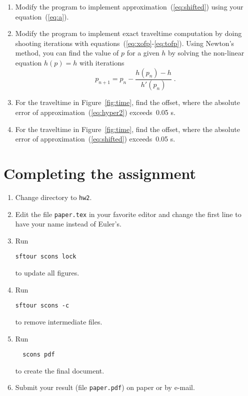 \begin{enumerate}
\item Modify the program to implement approximation~(\ref{eq:shifted}) using your equation~(\ref{eq:a}).
\item Modify the program to implement exact traveltime computation by doing shooting iterations with equations~(\ref{eq:xofp}-\ref{eq:tofp}). 
Using Newton's method, you can find the value of $p$ for a given $h$ by solving the non-linear equation $h(p)=h$ with iterations
\begin{equation}
\label{eq:newton2}
p_{n+1} = p_n - \frac{h(p_n)-h}{h'(p_n)}\;.
\end{equation}
\item For the traveltime in Figure~\ref{fig:time}, find the offset, where the absolute error of approximation~(\ref{eq:hyper2}) exceeds~0.05 s. 
\item For the traveltime in Figure~\ref{fig:time}, find the offset, where the absolute error of approximation~(\ref{eq:shifted}) exceeds~0.05 s. 
\end{enumerate}

\lstset{language=c,numbers=left,numberstyle=\tiny,showstringspaces=false}


\lstset{language=fortran,numbers=left,numberstyle=\tiny,showstringspaces=false}


\lstset{language=python,numbers=left,numberstyle=\tiny,showstringspaces=false}



\section{Completing the assignment}

\begin{enumerate}
\item Change directory to \verb#hw2#.
\item Edit the file \texttt{paper.tex} in your favorite editor and change the
  first line to have your name instead of Euler's.
\item Run
\begin{verbatim}
sftour scons lock
\end{verbatim}
to update all figures.
\item Run
\begin{verbatim}
sftour scons -c
\end{verbatim}
to remove intermediate files.
\item Run
\begin{verbatim} 
  scons pdf
\end{verbatim}
  to create the final document.
\item Submit your result (file \texttt{paper.pdf}) on paper or by
  e-mail. 
\end{enumerate}


 


